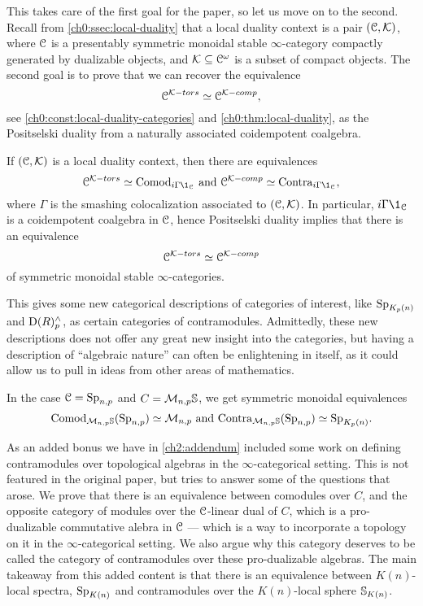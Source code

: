 This takes care of the first goal for the paper, so let us move on to the second. Recall from \cref{ch0:ssec:local-duality} that a local duality context is a pair $(\C, \K)$, where $\C$ is a presentably symmetric monoidal stable $\infty$-category compactly generated by dualizable objects, and $\K\subseteq \Co$ is a subset of compact objects. The second goal is to prove that we can recover the equivalence 
\[\C^{\K-tors}\simeq \C^{\K-comp},\] 
see \cref{ch0:const:local-duality-categories} and \cref{ch0:thm:local-duality}, as the Positselski duality from a naturally associated coidempotent coalgebra. 

\begin{theorem}
    If $(\C, \K)$ is a local duality context, then there are equivalences 
    \[\C^{\K-tors}\simeq \Comod_{i\Gamma \1_\C} \text{ and } \C^{\K-comp}\simeq \Contra_{i\Gamma \1_\C},\]
    where $\Gamma$ is the smashing colocalization associated to $(\C, \K)$. In particular, $i\Gamma \1_\C$ is a coidempotent coalgebra in $\C$, hence Positselski duality implies that there is an equivalence 
    \[\C^{\K-tors}\simeq \C^{\K-comp}\]
    of symmetric monoidal stable $\infty$-categories. 
\end{theorem}

This gives some new categorical descriptions of categories of interest, like $\SpKpn$ and $\Der(R)^\wedge_p$, as certain categories of contramodules. Admittedly, these new descriptions does not offer any great new insight into the categories, but having a description of ``algebraic nature'' can often be enlightening in itself, as it could allow us to pull in ideas from other areas of mathematics. 

\begin{example}
    In the case $\C= \Spn$ and $C = \Mn\S$, we get symmetric monoidal equivalences 
    \[\Comod_{\Mn\S}(\Spn) \simeq \Mn \text{ and } \Contra_{\Mn\S}(\Spn)\simeq \SpKpn.\]
\end{example}

As an added bonus we have in \cref{ch2:addendum} included some work on defining contramodules over topological algebras in the $\infty$-categorical setting. This is not featured in the original paper, but tries to answer some of the questions that arose. We prove that there is an equivalence between comodules over $C$, and the opposite category of modules over the $\C$-linear dual of $C$, which is a pro-dualizable commutative alebra in $\C$ --- which is a way to incorporate a topology on it in the $\infty$-categorical setting. We also argue why this category deserves to be called the category of contramodules over these pro-dualizable algebras. The main takeaway from this added content is that there is an equivalence between $K(n)$-local spectra, $\SpKn$ and contramodules over the $K(n)$-local sphere $\S_{K(n)}$. 





